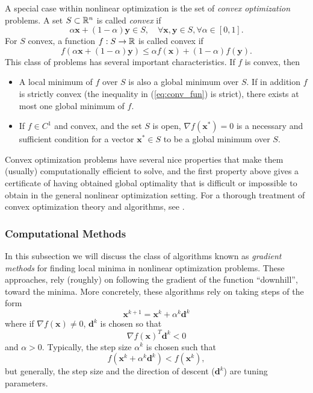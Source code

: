 A special case within nonlinear optimization is the set of \textit{convex optimization} problems. A set $S \subset \mathbb{R}^n$ is called \textit{convex} if 
\begin{equation}
    \alpha \bm{x} + (1 - \alpha) \bm{y} \in S, \quad \forall \bm{x},\bm{y} \in S, \forall \alpha \in [0,1].
\end{equation}
For $S$ convex, a function $f:S\to\mathbb{R}$ is called convex if 
\begin{equation}
    f(\alpha \bm{x} + (1-\alpha) \bm{y}) \leq \alpha f(\bm{x}) + (1-\alpha) f(\bm{y}).
    \label{eq:conv_fun}
\end{equation}
This class of problems has several important characteristics. If $f$ is convex, then
\begin{itemize}
    \item A local minimum of $f$ over $S$ is also a global minimum over $S$. If in addition $f$ is strictly convex (the inequality in (\ref{eq:conv_fun}) is strict), there exists at most one global minimum of $f$.
    \item If $f \in C^1$ and convex, and the set $S$ is open, $\nabla f(\bm{x}^*) = 0$ is a necessary and sufficient condition for a vector $\bm{x}^* \in S$ to be a global minimum over $S$.
\end{itemize}
Convex optimization problems have several nice properties that make them (usually) computationally efficient to solve, and the first property above gives a certificate of having obtained global optimality that is difficult or impossible to obtain in the general nonlinear optimization setting. For a thorough treatment of convex optimization theory and algorithms, see \cite{boyd2004convex}. 

\subsubsection{Computational Methods}

In this subsection we will discuss the class of algorithms known as \textit{gradient methods} for finding local minima in nonlinear optimization problems. These approaches, rely (roughly) on following the gradient of the function ``downhill'', toward the minima. More concretely, these algorithms rely on taking steps of the form
\begin{equation}
    \bm{x}^{k+1} = \bm{x}^k + \alpha^{k} \bm{d}^k
\end{equation}
where if $\nabla f(\bm{x}) \neq 0$, $\bm{d}^k$ is chosen so that 
\begin{equation}
    \nabla f(\bm{x})^T \bm{d}^k < 0
\end{equation}
and $\alpha > 0$. Typically, the step size $\alpha^k$ is chosen such that 
\begin{equation}
    f(\bm{x}^k + \alpha^k \bm{d}^k) < f(\bm{x}^k),
\end{equation}
but generally, the step size and the direction of descent ($\bm{d}^k$) are tuning parameters. 


